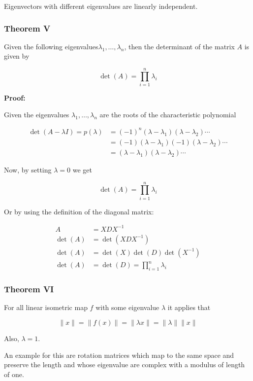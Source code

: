 Eigenvectors with different eigenvalues are linearly independent.

\subsubsection{Theorem V}

Given the following eigenvalues\(\lambda_1, \dots, \lambda_n\), then the 
determinant of the matrix \(A\) is given by 

\[
    \det(A) = \prod_{i = 1}^{n} \lambda_i
\]

\textbf{Proof:}

Given the eigenvalues \(\lambda_1, \dots, \lambda_n\) are the roots of the characteristic polynomial

\begin{align*}
    \det(A - \lambda I) = p (\lambda) &= (-1)^{n}(\lambda - \lambda_1)(\lambda - \lambda_2)\cdots\\
                                      &= (-1)(\lambda - \lambda_1)(-1)(\lambda - \lambda_2)\cdots\\     
                                      &= (\lambda - \lambda_1)(\lambda - \lambda_2)\cdots                       
\end{align*}

Now, by setting \(\lambda = 0\) we get 

\[
    \det(A) = \prod_{i = 1}^{n} \lambda_i
\]

Or by using the definition of the diagonal matrix:

\begin{align*}
    A &= XDX^{-1} \\
   \det(A) &= \det(XDX^{-1})\\
   \det(A) &= \det(X)\det(D)\det(X^{-1})\\
   \det(A) &= \det(D) = \prod_{i = 1}^{n} \lambda_i
\end{align*}

\QED

\subsubsection{Theorem VI}

For all linear isometric map \(f\) with some eigenvalue \(\lambda\) it applies that

\[
    \|x\| = \|f(x)\| = \|\lambda x\| = \|\lambda\|\|x\|
\]

Also, \(\lambda = 1\).

An example for this are rotation matrices which map to the same space and preserve the length and 
whose eigenvalue are complex with a modulus of length of one.

